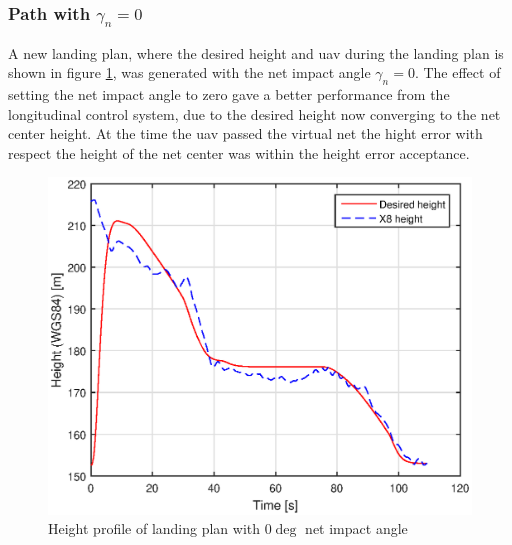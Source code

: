 \subsubsection{Path with $\gamma_n = 0$}
A new landing plan, where the desired height and \gls{uav} during the landing plan is shown in figure \ref{Fig:Height31mai31mai105034}, was generated with the net impact angle $\gamma_n = 0$. The effect of setting the net impact angle to zero gave a better performance from the longitudinal control system, due to the desired height now converging to the net center height. At the time the \gls{uav} passed the virtual net the hight error with respect the height of the net center was within the height error acceptance.
\begin{figure}[H]
\centering
		\includegraphics[scale=0.7]{figs/Experiment/Height31mai105034.eps}
		\caption{Height profile of landing plan with $0 \deg$ net impact angle}
		\label{Fig:Height31mai31mai105034}
\end{figure}
